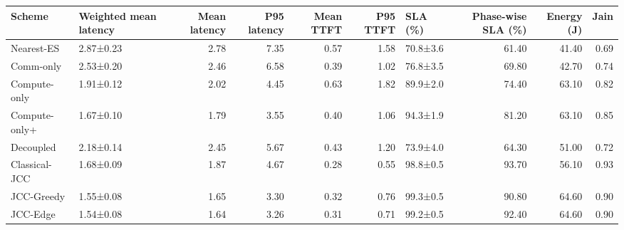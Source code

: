 \begin{tabular}{llrrrrlrrr}
\toprule
Scheme & Weighted mean latency & Mean latency & P95 latency & Mean TTFT & P95 TTFT & SLA (\%) & Phase-wise SLA (\%) & Energy (J) & Jain \\
\midrule
Nearest-ES & 2.87±0.23 & 2.78 & 7.35 & 0.57 & 1.58 & 70.8±3.6 & 61.40 & 41.40 & 0.69 \\
Comm-only & 2.53±0.20 & 2.46 & 6.58 & 0.39 & 1.02 & 76.8±3.5 & 69.80 & 42.70 & 0.74 \\
Compute-only & 1.91±0.12 & 2.02 & 4.45 & 0.63 & 1.82 & 89.9±2.0 & 74.40 & 63.10 & 0.82 \\
Compute-only+ & 1.67±0.10 & 1.79 & 3.55 & 0.40 & 1.06 & 94.3±1.9 & 81.20 & 63.10 & 0.85 \\
Decoupled & 2.18±0.14 & 2.45 & 5.67 & 0.43 & 1.20 & 73.9±4.0 & 64.30 & 51.00 & 0.72 \\
Classical-JCC & 1.68±0.09 & 1.87 & 4.67 & 0.28 & 0.55 & 98.8±0.5 & 93.70 & 56.10 & 0.93 \\
JCC-Greedy & 1.55±0.08 & 1.65 & 3.30 & 0.32 & 0.76 & 99.3±0.5 & 90.80 & 64.60 & 0.90 \\
JCC-Edge & 1.54±0.08 & 1.64 & 3.26 & 0.31 & 0.71 & 99.2±0.5 & 92.40 & 64.60 & 0.90 \\
\bottomrule
\end{tabular}
